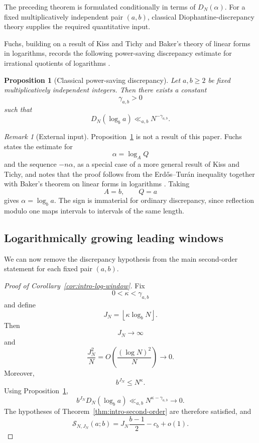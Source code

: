 \documentclass[11pt]{article}
\newtheorem{proposition}[theorem]{Proposition}
\theoremstyle{definition}
\theoremstyle{remark}
\newtheorem*{remark}{Remark}
\begin{document}
The preceding theorem is formulated conditionally in terms of
\(D_N(\alpha)\).  For a fixed multiplicatively independent pair
\((a,b)\), classical Diophantine-discrepancy theory supplies the
required quantitative input.

Fuchs, building on a result of Kiss and Tichy and Baker's theory of
linear forms in logarithms, records the following power-saving
discrepancy estimate for irrational quotients of logarithms
\cite[Lemma~2]{Fuchs2002}.

\begin{proposition}[Classical power-saving discrepancy]
\label{prop:power-saving-discrepancy}
Let \(a,b\ge2\) be fixed multiplicatively independent integers.  Then
there exists a constant
\[
    \gamma_{a,b}>0
\]
such that
\begin{equation}
\boxed{
    D_N(\log_b a)
    \ll_{a,b}
    N^{-\gamma_{a,b}}.
}
\label{eq:power-saving-discrepancy}
\end{equation}
\end{proposition}

\begin{remark}[External input]
\label{rem:discrepancy-external-input}
Proposition~\ref{prop:power-saving-discrepancy} is not a result of this
paper.  Fuchs states the estimate for
\[
    \alpha=\log_A Q
\]
and the sequence \(-n\alpha\), as a special case of a more general
result of Kiss and Tichy, and notes that the proof follows from the
Erd\H{o}s--Tur\'an inequality together with Baker's theorem on linear
forms in logarithms
\cite{Fuchs2002,KissTichy1989I,KissTichy1989II}.
Taking
\[
    A=b,
    \qquad
    Q=a
\]
gives \(\alpha=\log_b a\).
The sign is immaterial for ordinary discrepancy, since reflection
modulo one maps intervals to intervals of the same length.
\end{remark}


\subsection{Logarithmically growing leading windows}
\label{subsec:logarithmic-leading-windows}

We can now remove the discrepancy hypothesis from the main
second-order statement for each fixed pair \((a,b)\).

\begin{proof}[Proof of
Corollary~\ref{cor:intro-log-window}]
Fix
\[
    0<\kappa<\gamma_{a,b}
\]
and define
\[
    J_N
    =
    \left\lfloor
        \kappa\log_bN
    \right\rfloor.
\]
Then
\[
    J_N\longrightarrow\infty
\]
and
\[
    \frac{J_N^2}{N}
    =
    O\!\left(
        \frac{(\log N)^2}{N}
    \right)
    \longrightarrow0.
\]
Moreover,
\[
    b^{J_N}
    \le
    N^\kappa.
\]
Using
Proposition~\ref{prop:power-saving-discrepancy},
\[
    b^{J_N}D_N(\log_ba)
    \ll_{a,b}
    N^{\kappa-\gamma_{a,b}}
    \longrightarrow0.
\]
The hypotheses of
Theorem~\ref{thm:intro-second-order}
are therefore satisfied, and
\[
\boxed{
    \mathcal S_{N,J_N}(a;b)
    =
    J_N\frac{b-1}{2}
    -
    c_b
    +
    o(1).
}
\]
\end{proof}
\end{document}
